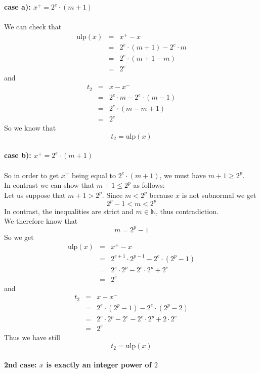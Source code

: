 \documentclass[a4paper,10pt,twoside]{article}
\newenvironment{proof}[1][Proof]{\begin{trivlist}
\item[\hskip \labelsep {\bfseries #1}]}{\end{trivlist}}
\newcommand{\N}{\ensuremath{\mathbb {N}}}
\newcommand{\mUlp}{\ensuremath{\mathrm{ulp}}}
\begin{document}
\begin{proof}
{\bf case a): $x^+ = 2^e \cdot \left( m + 1 \right)$} \\ ~ \\
We can check that
\begin{eqnarray*}
\mUlp \left( x \right) & = & x^+ - x \\
& = & 2^e \cdot \left( m + 1 \right) - 2^e \cdot m \\
& = & 2^e \cdot \left(m + 1 - m \right) \\
& = & 2^e
\end{eqnarray*}
and
\begin{eqnarray*}
t_2 & = & x - x^- \\
& = & 2^e \cdot m - 2^e \cdot \left( m - 1 \right) \\
& = & 2^e \cdot \left( m - m + 1 \right) \\
& = & 2^e
\end{eqnarray*}
So we know that
$$t_2 = \mUlp \left( x \right)$$ ~ \\
{\bf case b): $x^+ = 2^e \cdot \left( m + 1 \right)$} \\ ~ \\
So in order to get $x^+$ being equal to $2^e \cdot \left( m + 1 \right)$, we must have $m+1 \geq 2^p$. \\
In contrast we can show that $m+1 \leq 2^p$ as follows: \\
Let us suppose that $m+1 > 2^p$. Since $m < 2^p$ because $x$ is not subnormal we get
$$2^p - 1 < m < 2^p$$
In contrast, the inequalities are strict and $m \in \N$, thus contradiction. \\
We therefore know that
$$m=2^p - 1$$
So we get
\begin{eqnarray*}
\mUlp \left( x \right) & = & x^+ - x \\
& = & 2^{e+1} \cdot 2^{p-1} - 2^e \cdot \left( 2^p - 1 \right) \\
& = & 2^e \cdot 2^p - 2^e \cdot 2^p + 2^e \\
& = & 2^e
\end{eqnarray*}
and
\begin{eqnarray*}
t_2 & = & x - x^- \\
& = & 2^e \cdot \left( 2^p - 1 \right) - 2^e \cdot \left( 2^p - 2 \right) \\
& = & 2^e \cdot 2^p - 2^e - 2^e \cdot 2^p + 2 \cdot 2^e \\
& = & 2^e
\end{eqnarray*}
Thus we have still
$$t_2 = \mUlp \left( x \right)$$ ~ \\
{\bf 2nd case: $x$ is exactly an integer power of $2$ } \\ ~ \\

\end{proof}
\end{document}
